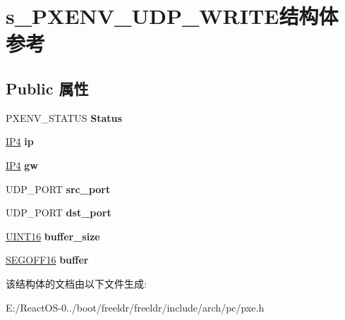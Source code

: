\hypertarget{structs___p_x_e_n_v___u_d_p___w_r_i_t_e}{}\section{s\+\_\+\+P\+X\+E\+N\+V\+\_\+\+U\+D\+P\+\_\+\+W\+R\+I\+T\+E结构体 参考}
\label{structs___p_x_e_n_v___u_d_p___w_r_i_t_e}
\subsection*{Public 属性}
\begin{DoxyCompactItemize}
\item 
\mbox{\label{structs___p_x_e_n_v___u_d_p___w_r_i_t_e_a12d1d4d21823b0c11f1af0a0d9a82d79}} 
P\+X\+E\+N\+V\+\_\+\+S\+T\+A\+T\+US {\bfseries Status}
\item 
\mbox{\label{structs___p_x_e_n_v___u_d_p___w_r_i_t_e_ab60a6c722399999edcc951bb44998c63}} 
\hyperlink{union_i_p4}{I\+P4} {\bfseries ip}
\item 
\mbox{\label{structs___p_x_e_n_v___u_d_p___w_r_i_t_e_aa077bebcb66dc76d76f7ea6677eda914}} 
\hyperlink{union_i_p4}{I\+P4} {\bfseries gw}
\item 
\mbox{\label{structs___p_x_e_n_v___u_d_p___w_r_i_t_e_a4d66d24238c84a7ce18c123039b7fcd5}} 
U\+D\+P\+\_\+\+P\+O\+RT {\bfseries src\+\_\+port}
\item 
\mbox{\label{structs___p_x_e_n_v___u_d_p___w_r_i_t_e_a3e97c8523954970a98ce10a4ba61121e}} 
U\+D\+P\+\_\+\+P\+O\+RT {\bfseries dst\+\_\+port}
\item 
\mbox{\label{structs___p_x_e_n_v___u_d_p___w_r_i_t_e_a3e0fac57843a0e723550b0d5d4854037}} 
\hyperlink{_processor_bind_8h_a09f1a1fb2293e33483cc8d44aefb1eb1}{U\+I\+N\+T16} {\bfseries buffer\+\_\+size}
\item 
\mbox{\label{structs___p_x_e_n_v___u_d_p___w_r_i_t_e_a6bf14ed5028e87c584373fcf9355b21e}} 
\hyperlink{structs___s_e_g_o_f_f16}{S\+E\+G\+O\+F\+F16} {\bfseries buffer}
\end{DoxyCompactItemize}


该结构体的文档由以下文件生成\+:\begin{DoxyCompactItemize}
\item 
E\+:/\+React\+O\+S-\/0../boot/freeldr/freeldr/include/arch/pc/pxe.\+h\end{DoxyCompactItemize}

